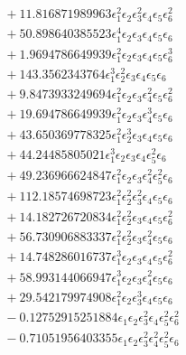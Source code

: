 \documentclass[10pt]{article}
\begin{document}
\begin{align*}
&{}  + 11.816871989963 \epsilon_{1}^{2} \epsilon_{2} \epsilon_{3}^{2} \epsilon_{4} \epsilon_{5} \epsilon_{6}^{2} \\
&{}  + 50.898640385523 \epsilon_{1}^{4} \epsilon_{2} \epsilon_{3} \epsilon_{4} \epsilon_{5} \epsilon_{6} \\
&{}  + 1.9694786649939 \epsilon_{1}^{2} \epsilon_{2} \epsilon_{3} \epsilon_{4} \epsilon_{5} \epsilon_{6}^{3} \\
&{}  + 143.3562343764 \epsilon_{1}^{3} \epsilon_{2}^{2} \epsilon_{3} \epsilon_{4} \epsilon_{5} \epsilon_{6} \\
&{}  + 9.8473933249694 \epsilon_{1}^{2} \epsilon_{2} \epsilon_{3} \epsilon_{4}^{2} \epsilon_{5} \epsilon_{6}^{2} \\
&{}  + 19.694786649939 \epsilon_{1}^{2} \epsilon_{2} \epsilon_{3} \epsilon_{4}^{3} \epsilon_{5} \epsilon_{6} \\
&{}  + 43.650369778325 \epsilon_{1}^{2} \epsilon_{2}^{3} \epsilon_{3} \epsilon_{4} \epsilon_{5} \epsilon_{6} \\
&{}  + 44.24485805021 \epsilon_{1}^{3} \epsilon_{2} \epsilon_{3} \epsilon_{4} \epsilon_{5}^{2} \epsilon_{6} \\
&{}  + 49.236966624847 \epsilon_{1}^{2} \epsilon_{2} \epsilon_{3} \epsilon_{4}^{2} \epsilon_{5}^{2} \epsilon_{6} \\
&{}  + 112.18574698723 \epsilon_{1}^{2} \epsilon_{2}^{2} \epsilon_{3}^{2} \epsilon_{4} \epsilon_{5} \epsilon_{6} \\
&{}  + 14.182726720834 \epsilon_{1}^{2} \epsilon_{2}^{2} \epsilon_{3} \epsilon_{4} \epsilon_{5} \epsilon_{6}^{2} \\
&{}  + 56.730906883337 \epsilon_{1}^{2} \epsilon_{2}^{2} \epsilon_{3} \epsilon_{4}^{2} \epsilon_{5} \epsilon_{6} \\
&{}  + 14.748286016737 \epsilon_{1}^{3} \epsilon_{2} \epsilon_{3} \epsilon_{4} \epsilon_{5} \epsilon_{6}^{2} \\
&{}  + 58.993144066947 \epsilon_{1}^{3} \epsilon_{2} \epsilon_{3} \epsilon_{4}^{2} \epsilon_{5} \epsilon_{6} \\
&{}  + 29.542179974908 \epsilon_{1}^{2} \epsilon_{2} \epsilon_{3}^{3} \epsilon_{4} \epsilon_{5} \epsilon_{6} \\
&{}  - 0.12752915251884 \epsilon_{1} \epsilon_{2} \epsilon_{3}^{2} \epsilon_{4} \epsilon_{5}^{2} \epsilon_{6}^{2} \\
&{}  - 0.71051956403355 \epsilon_{1} \epsilon_{2} \epsilon_{3}^{2} \epsilon_{4}^{2} \epsilon_{5}^{2} \epsilon_{6} \\

\end{align*}
\end{document}
